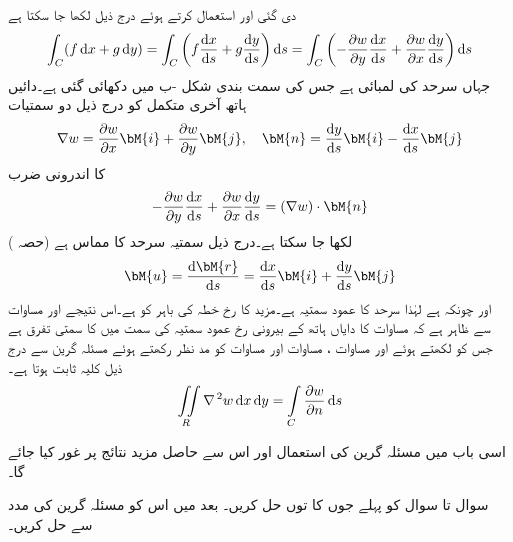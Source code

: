 دی گئی  اور  استعمال کرتے ہوئے  درج ذیل لکھا جا سکتا ہے
\begin{align}\label{مساوات_خطی_تکمل_لاپلاسی_کا_دوہرا_ب}
\int_C(f\dif x+g\dif y)=\int_C\left(f\frac{\dif x}{\dif s}+g\frac{\dif y}{\dif s}\right)\dif s=\int_C\left(-\frac{\partial w}{\partial y}\frac{\dif x}{\dif s}+\frac{\partial w}{\partial x}\frac{\dif y}{\dif s}\right)\dif s
\end{align}
جہاں  سرحد  کی لمبائی ہے جس کی سمت بندی شکل -ب میں دکھائی گئی ہے۔دائیں ہاتھ آخری متکمل کو درج ذیل دو سمتیات
\begin{align*}
\nabla w=\frac{\partial w}{\partial x}\bM{i}+\frac{\partial w}{\partial y}\bM{j}, \quad \bM{n}=\frac{\dif y}{\dif s}\bM{i}-\frac{\dif x}{\dif s}\bM{j}
\end{align*} 
 کا اندرونی ضرب
\begin{align}\label{مساوات_خطی_تکمل_سمتی_تفرق_الف}
-\frac{\partial w}{\partial y}\frac{\dif x}{\dif s}+\frac{\partial w}{\partial x}\frac{\dif y}{\dif s}=\left(\nabla w\right)\cdot \bM{n}
\end{align}
لکھا جا سکتا ہے۔درج ذیل سمتیہ  سرحد  کا مماس ہے (حصہ ) 
\begin{align*}
\bM{u}=\frac{\dif \bM{r}}{\dif s}=\frac{\dif x}{\dif s}\bM{i}+\frac{\dif y}{\dif s}\bM{j}
\end{align*}
اور چونکہ  ہے لہٰذا  سرحد  کا  عمود سمتیہ ہے۔مزید  کا رخ خطہ  کی باہر کو ہے۔اس نتیجے اور مساوات  سے ظاہر ہے کہ مساوات  کا دایاں ہاتھ  کے بیرونی رخ عمود سمتیہ  کی سمت میں  کا سمتی تفرق ہے  جس کو  لکھتے ہوئے اور مساوات ، مساوات  اور مساوات  کو مد نظر رکھتے ہوئے مسئلہ گرین سے درج ذیل کلیہ ثابت ہوتا ہے۔
\begin{align}\label{مساوات_خطی_تکمل_لاپلاسی_قائمہ_تبادل}
\iint\limits_R \nabla^{\,2} w\dif x\dif y=\int\limits_C \frac{\partial w}{\partial n} \dif s
\end{align}

اسی باب میں مسئلہ گرین کی استعمال اور اس سے حاصل مزید نتائج پر غور کیا جائے گا۔

سوال  تا سوال  کو پہلے  جوں کا توں حل کریں۔ بعد میں اس کو مسئلہ گرین کی مدد سے حل کریں۔


